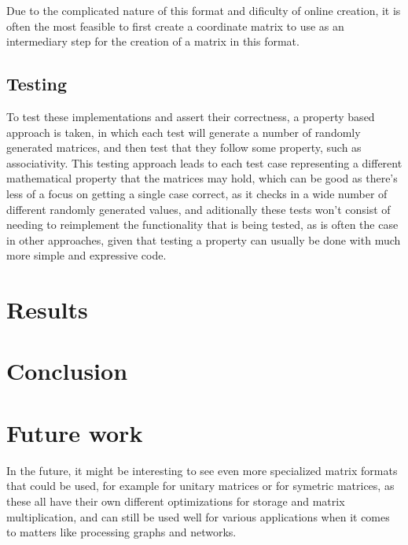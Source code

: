 \documentclass{article}
\begin{document}
Due to the complicated nature of this format and dificulty of online creation, it is often the most feasible to
first create a coordinate matrix to use as an intermediary step for the creation of a matrix in this format.

\subsection{Testing}

To test these implementations and assert their correctness,
a property based approach is taken, in which each test will
generate a number of randomly generated matrices, and then test that they
follow some property, such as associativity.
This testing approach leads to each test case representing a different mathematical property that the matrices may hold,
which can be good as there's less of a focus on getting a single case correct, as it checks in a wide number of different randomly generated
values, and aditionally these tests won't consist of needing to reimplement the functionality that is being tested,
as is often the case in other approaches, given that testing a property can usually be done with much more simple and expressive code.

\section{Results}

\section{Conclusion}

\section{Future work}

In the future, it might be interesting to see even more specialized matrix formats that could be used,
for example for unitary matrices or for symetric matrices,
as these all have their own different optimizations for storage and matrix multiplication, and can still
be used well for various applications when it comes to matters like processing graphs and networks.
\end{document}
